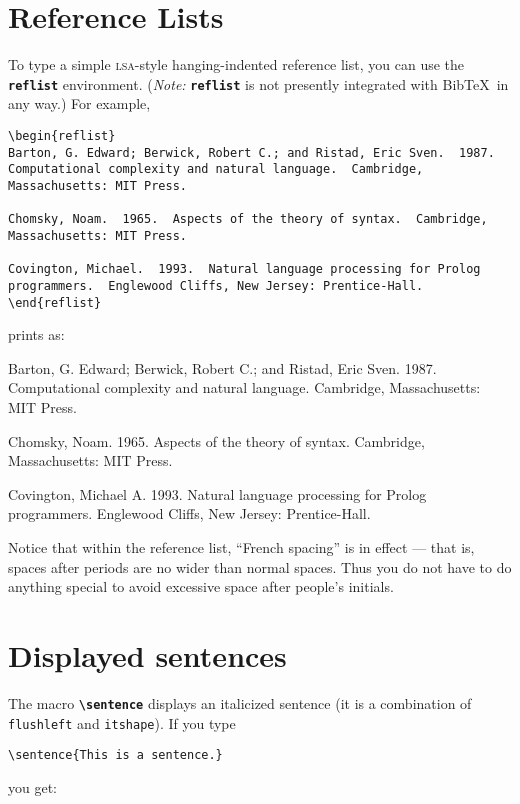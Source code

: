 \documentclass[english]{article}
\newcommand*\jmacro[1]{\textbf{\texttt{#1}}}
\newcommand*\jenv[1]{\textbf{\texttt{#1}}}
\newcommand*\jcsmacro[1]{\jmacro{\textbackslash{#1}}}
\newcommand*\jfmacro[1]{\texttt{#1}}
\newcommand*\jfenv[1]{\texttt{#1}}
\begin{document}
\section{Reference Lists}

To type a simple \textsc{lsa}-style hanging-indented reference list, you can use the \jenv{reflist}
environment.  (\emph{Note:} \jenv{reflist} is not presently
integrated with Bib\TeX\ in any way.)  For example,
\begin{lstlisting}
\begin{reflist}
Barton, G. Edward; Berwick, Robert C.; and Ristad, Eric Sven.  1987.
Computational complexity and natural language.  Cambridge, 
Massachusetts: MIT Press.

Chomsky, Noam.  1965.  Aspects of the theory of syntax.  Cambridge,
Massachusetts: MIT Press.

Covington, Michael.  1993.  Natural language processing for Prolog
programmers.  Englewood Cliffs, New Jersey: Prentice-Hall.
\end{reflist}
\end{lstlisting}
prints as:
\begin{reflist}
Barton, G. Edward; Berwick, Robert C.; and Ristad, Eric Sven.  1987.
Computational complexity and natural language.  Cambridge, 
Massachusetts: MIT Press.

Chomsky, Noam.  1965.  Aspects of the theory of syntax.  Cambridge,
Massachusetts: MIT Press.

Covington, Michael A.  1993.  Natural language processing for Prolog 
programmers.  Englewood Cliffs, New Jersey: Prentice-Hall.
\end{reflist}
Notice that within the reference list, ``French spacing'' is in effect 
--- that is, spaces after periods are no wider than normal spaces. Thus 
you do not have to do anything special to avoid excessive space after 
people's initials.


\section{Displayed sentences}

The macro \jcsmacro{sentence} displays an italicized sentence (it is a 
combination of \jfenv{flushleft} and \jfmacro{itshape}).  If you type
\begin{lstlisting}[moretexcs={sentence}]
\sentence{This is a sentence.}
\end{lstlisting}
you get:
\end{document}
